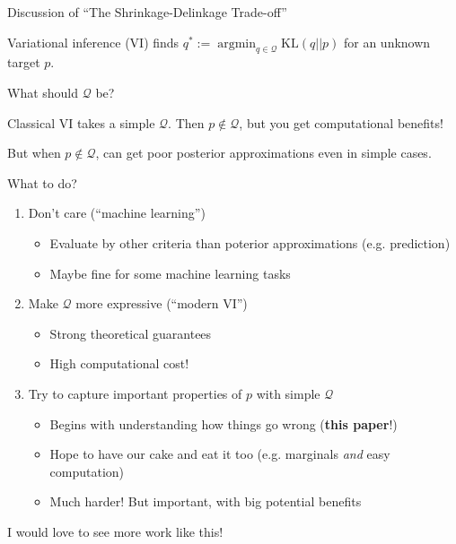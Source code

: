 \documentclass[8pt]{beamer}\usepackage[]{graphicx}\usepackage[]{color}
\DeclareMathOperator*{\argmin}{\mathrm{argmin}}
\def\kl#1#2{\mathrm{KL}\left(#1 || #2\right)}
\def\qdom{\mathcal{Q}}
\def\q{q}
\def\p{p}
\begin{document}
\begin{frame}{Discussion of ``The Shrinkage-Delinkage Trade-off''}

Variational inference (VI) finds
$q^* := \argmin_{\q \in \qdom} \kl{\q}{\p}$ for an unknown target $\p$.
%
%

What should $\qdom$ be?

\pause

Classical VI takes a simple $\qdom$. Then $\p \notin \qdom$, but 
you get computational benefits!

\pause

But when $\p \notin \qdom$, can get poor posterior approximations even in simple
cases.  

What to do?

\pause
%
\begin{enumerate}
%
\item Don't care (``machine learning'')
%
\begin{itemize}
    \item Evaluate by other criteria than
    poterior approximations (e.g. prediction)
    \item Maybe fine for some machine learning tasks
\end{itemize}
%
\pause
\item Make $\qdom$ more expressive (``modern VI'')
%
\begin{itemize}
    \item Strong theoretical guarantees
    \item High computational cost!
\end{itemize}
\pause
%
\item Try to capture important properties of $\p$ with simple $\qdom$
%
\begin{itemize}
    \item Begins with understanding how things go wrong (\textbf{this paper}!)
    \item Hope to have our cake and eat it too (e.g. marginals \emph{and} easy computation)
    \item Much harder!  But important, with big potential benefits
\end{itemize}
%
\end{enumerate}
%

I would love to see more work like this!


\end{frame}
\end{document}
